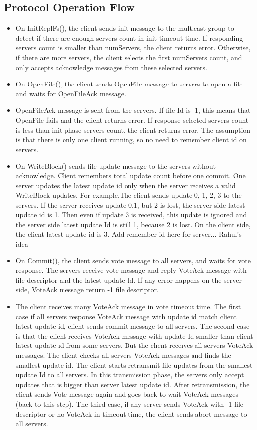 \documentclass[12pt,fleqn]{article}
\begin{document}
\subsection{Protocol Operation Flow}
\begin{itemize}
	\item On InitReplFs(), the client sends init message to the multicast group to detect if there are enough servers count in init timeout time. If responding servers count is smaller than numServers, the client returns error. Otherwise, if there are more servers, the client selects the first numServers count, and only accepts acknowledge messages from these selected servers.
	\item On OpenFile(), the client sends OpenFile message to servers to open a file and waits for OpenFileAck message.
	\item OpenFileAck message is sent from the servers. If file Id is -1, this means that OpenFile fails and the client returns error. If response selected servers count is less than init phase servers count, the client returns error. The assumption is that there is only one client running, so no need to remember client id on servers.
	\item On WriteBlock() sends file update message to the servers without acknowledge. Client remembers total update count before one commit. One server updates the latest update id only when the server receives a valid WriteBlock updates. For example,The client sends update 0, 1, 2, 3 to the servers. If the server receives update 0,1, but 2 is lost, the server side latest update id is 1. Then even if update 3 is received, this update is ignored and the server side latest update Id is still 1, because 2 is lost. On the client side, the client latest update id is 3. Add remember id here for server... Rahul's idea
	\item On Commit(), the client sends vote message to all servers, and waits for vote response. The servers receive vote message and reply VoteAck message with file descriptor and the latest update Id. If any error happens on the server side, VoteAck message return -1 file descriptor.
	\item The client receives many VoteAck message in vote timeout time. The first case if all servers response VoteAck message with update id match client latest update id, client sends commit message to all servers. The second case is that the client receives VoteAck message with update Id smaller than client latest update id from some servers. But the client receives all servers VoteAck messages. The client checks all servers VoteAck messages and finds the smallest update id. The client starts retransmit file updates from the smallest update Id to all servers. In this transmission phase, the servers only accept updates that is bigger than server latest update id. After retransmission, the client sends Vote message again and goes back to wait VoteAck messages (back to this step). The third case, if any server sends VoteAck with -1 file descriptor or no VoteAck in timeout time, the client sends abort message to all servers.

\end{itemize}
\end{document}
